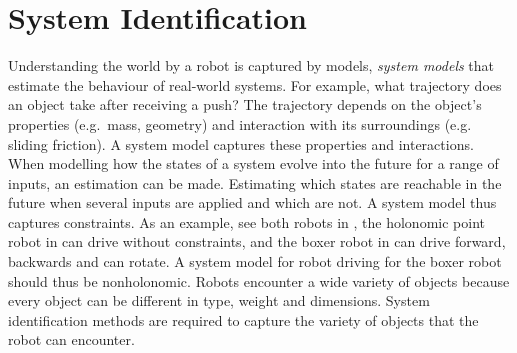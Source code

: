 \section{System Identification}%
\label{sec:sys_iden}
Understanding the world by a robot is captured by models, \textit{system models} that estimate the behaviour of real-world systems. For example, what trajectory does an object take after receiving a push? The trajectory depends on the object's properties (e.g.~mass, geometry) and interaction with its surroundings (e.g. sliding friction). A system model captures these properties and interactions. When modelling how the states of a system evolve into the future for a range of inputs, an estimation can be made. Estimating which states are reachable in the future when several inputs are applied and which are not. A system model thus captures constraints. As an example, see both robots in , the holonomic point robot in  can drive without constraints, and the boxer robot in  can drive forward, backwards and can rotate. A system model for robot driving for the boxer robot should thus be nonholonomic. Robots encounter a wide variety of objects because every object can be different in type, weight and dimensions. System identification methods are required to capture the variety of objects that the robot can encounter.\bs




